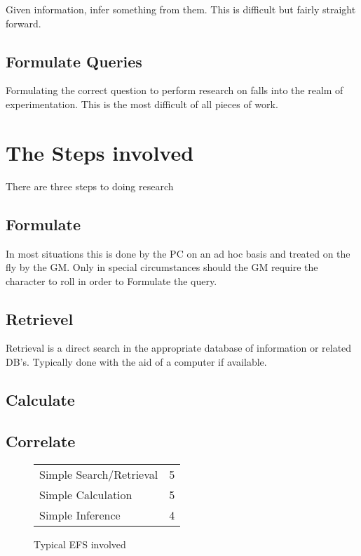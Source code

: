 Given information, infer something from them. This is difficult but
fairly straight forward.

\subsection{Formulate Queries}

Formulating the correct question to perform research on falls into 
the realm of experimentation. This is the most difficult of all 
pieces of work.

\section{The Steps involved}

There are three steps to doing research 

\subsection{Formulate}
In most situations this is done by the PC on an ad hoc basis and
treated on the fly by the GM. Only in special circumstances should the GM
require the character to roll in order to Formulate the query.

\subsection{Retrievel}

Retrieval is a direct search in the appropriate database of
information or related DB's. Typically done with the aid of a
computer if available.

\subsection{Calculate}

\subsection{Correlate}

\begin{figure}[htb]
\caption{Typical EFS involved}
	\begin{tabular}{||l|l||} \hline
	Simple Search/Retrieval   &  5 \\
	Simple Calculation        &  5 \\
	Simple Inference          &  4 \\ \hline
	\end{tabular}
\end{figure}

